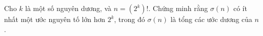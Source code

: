 \ifshowproblem
\begin{problem}\label{example:CHN-2015-WMO-P8}
    Cho $k$ là một số nguyên dương, và $n = \left(2^k\right)!$. Chứng minh rằng $\sigma(n)$ có ít nhất một ước nguyên tố lớn hơn $2^k$,
    trong đó $\sigma(n)$ là tổng các ước dương của $n$.
\end{problem}
\fi

\footnotemark
{}
\fi